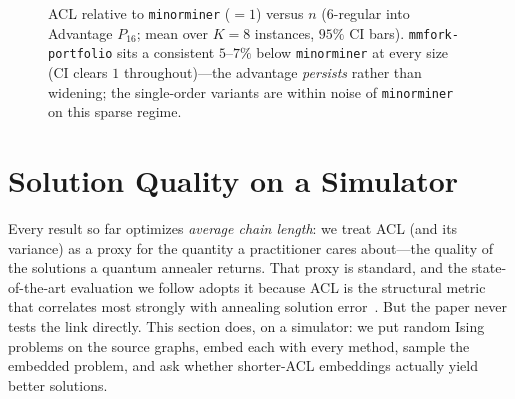 \documentclass[acmsmall,anonymous,nonacm]{acmart}
\begin{document}
\begin{figure}[t]
\centering
{}
\caption{ACL relative to \texttt{minorminer} ($=1$) versus $n$ ($6$-regular into
Advantage $P_{16}$; mean over $K{=}8$ instances, $95\%$ CI bars).
\texttt{mmfork-portfolio} sits a consistent $5$--$7\%$ below \texttt{minorminer} at
every size (CI clears $1$ throughout)---the advantage \emph{persists} rather than
widening; the single-order variants are within noise of \texttt{minorminer} on this
sparse regime.}
\label{fig:scalingacl}
\end{figure}

\section{Solution Quality on a Simulator}
\label{sec:solquality}

Every result so far optimizes \emph{average chain length}: we treat ACL (and its
variance) as a proxy for the quantity a practitioner cares about---the quality of
the solutions a quantum annealer returns. That proxy is standard, and the
state-of-the-art evaluation we follow adopts it because ACL is the structural metric
that correlates most strongly with annealing solution error~\cite{gomez2025eval}.
But the paper never tests the link directly. This section does, on a simulator: we
put random Ising problems on the source graphs, embed each with every method, sample
the embedded problem, and ask whether shorter-ACL embeddings actually yield better
solutions.
\end{document}
